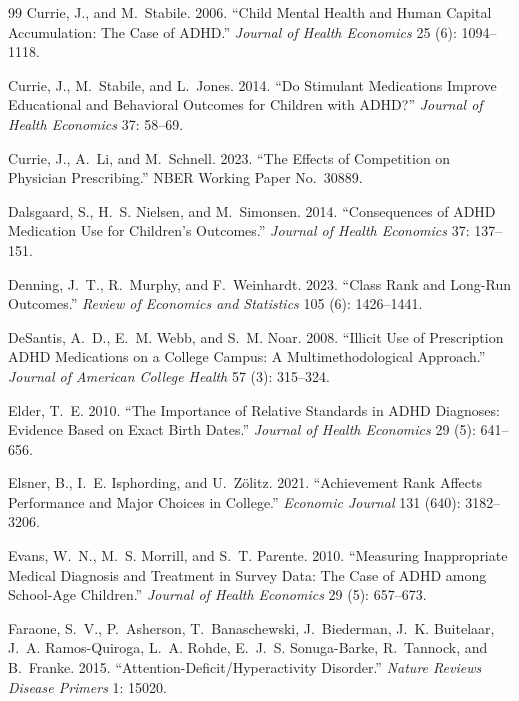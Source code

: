 \documentclass[12pt]{article}
\begin{document}
\begin{thebibliography}{99}
Currie, J., and M.~Stabile. 2006. ``Child Mental Health and Human Capital Accumulation: The Case of ADHD.'' \textit{Journal of Health Economics} 25 (6): 1094--1118.

Currie, J., M.~Stabile, and L.~Jones. 2014. ``Do Stimulant Medications Improve Educational and Behavioral Outcomes for Children with ADHD?'' \textit{Journal of Health Economics} 37: 58--69.

Currie, J., A.~Li, and M.~Schnell. 2023. ``The Effects of Competition on Physician Prescribing.'' NBER Working Paper No.~30889.

Dalsgaard, S., H.~S. Nielsen, and M.~Simonsen. 2014. ``Consequences of ADHD Medication Use for Children's Outcomes.'' \textit{Journal of Health Economics} 37: 137--151.

Denning, J.~T., R.~Murphy, and F.~Weinhardt. 2023. ``Class Rank and Long-Run Outcomes.'' \textit{Review of Economics and Statistics} 105 (6): 1426--1441.

DeSantis, A.~D., E.~M. Webb, and S.~M. Noar. 2008. ``Illicit Use of Prescription ADHD Medications on a College Campus: A Multimethodological Approach.'' \textit{Journal of American College Health} 57 (3): 315--324.

Elder, T.~E. 2010. ``The Importance of Relative Standards in ADHD Diagnoses: Evidence Based on Exact Birth Dates.'' \textit{Journal of Health Economics} 29 (5): 641--656.

Elsner, B., I.~E. Isphording, and U.~Z{\"o}litz. 2021. ``Achievement Rank Affects Performance and Major Choices in College.'' \textit{Economic Journal} 131 (640): 3182--3206.

Evans, W.~N., M.~S. Morrill, and S.~T. Parente. 2010. ``Measuring Inappropriate Medical Diagnosis and Treatment in Survey Data: The Case of ADHD among School-Age Children.'' \textit{Journal of Health Economics} 29 (5): 657--673.

Faraone, S.~V., P.~Asherson, T.~Banaschewski, J.~Biederman, J.~K. Buitelaar, J.~A. Ramos-Quiroga, L.~A. Rohde, E.~J.~S. Sonuga-Barke, R.~Tannock, and B.~Franke. 2015. ``Attention-Deficit/Hyperactivity Disorder.'' \textit{Nature Reviews Disease Primers} 1: 15020.


\end{thebibliography}
\end{document}
